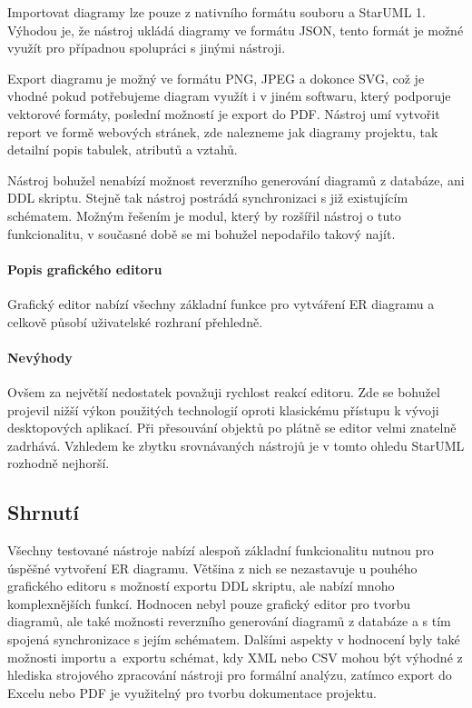 \documentclass[czech,bachelor,public,dept460,male,oneside]{diploma}
\begin{document}
		Importovat diagramy lze pouze z nativního formátu souboru a StarUML 1. Výhodou je, že nástroj ukládá diagramy ve formátu JSON, tento formát je možné využít pro případnou spolupráci s jinými nástroji.
		
		Export diagramu je možný ve formátu PNG, JPEG a dokonce SVG, což je vhodné pokud potřebujeme diagram využít i v jiném softwaru, který podporuje vektorové formáty, poslední možností je export do PDF. Nástroj umí vytvořit report ve formě webových stránek, zde nalezneme jak diagramy projektu, tak detailní popis tabulek, atributů a vztahů. 
		
		Nástroj bohužel nenabízí možnost reverzního generování diagramů z databáze, ani DDL skriptu. Stejně tak nástroj postrádá synchronizaci s již existujícím schématem. Možným řešením je modul, který by rozšířil nástroj o tuto funkcionalitu, v současné době se mi bohužel nepodařilo takový najít.
		\paragraph{Popis grafického editoru}
		Grafický editor nabízí všechny základní funkce pro vytváření ER diagramu a celkově působí uživatelské rozhraní přehledně. 
		
		\paragraph{Nevýhody}
		Ovšem za největší nedostatek považuji rychlost reakcí editoru. Zde se bohužel projevil nižší výkon použitých technologií oproti klasickému přístupu k vývoji desktopových aplikací. Při přesouvání objektů po plátně se editor velmi znatelně zadrhává. Vzhledem ke zbytku srovnávaných nástrojů je v tomto ohledu StarUML rozhodně nejhorší.
	
	\subsection{Shrnutí}
	Všechny testované nástroje nabízí alespoň základní funkcionalitu nutnou pro úspěšné vytvoření ER diagramu. Většina z nich se nezastavuje u pouhého grafického editoru s možností exportu DDL skriptu, ale nabízí mnoho komplexnějších funkcí. Hodnocen nebyl pouze grafický editor pro tvorbu diagramů, ale také možnosti reverzního generování diagramů z databáze a s tím spojená synchronizace s jejím schématem. Dalšími aspekty v hodnocení byly také možnosti importu a~exportu schémat, kdy XML nebo CSV mohou být výhodné z hlediska strojového zpracování nástroji pro formální analýzu, zatímco export do Excelu nebo PDF je využitelný pro tvorbu dokumentace projektu.
	
\end{document}
